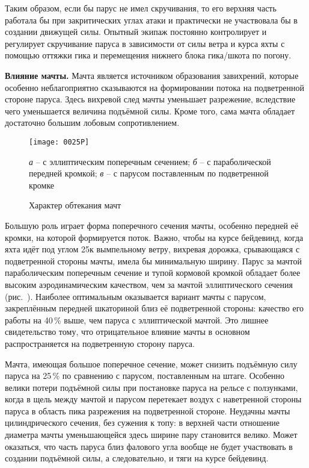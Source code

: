 Таким образом, если бы парус не имел скручивания, то его верхняя часть работала бы при закритических углах атаки и практически не участвовала бы в создании движущей силы. Опытный экипаж постоянно контролирует и регулирует скручивание паруса в зависимости от силы ветра и курса яхты с помощью оттяжки гика и перемещения нижнего блока гика\-/шкота по погону.

\textbf{Влияние мачты.} Мачта является источником образования завихрений, которые особенно неблагоприятно сказываются на формировании потока на подветренной стороне паруса. Здесь вихревой след мачты уменьшает разрежение, вследствие чего уменьшается величина подъёмной силы. Кроме того, сама мачта обладает достаточно большим лобовым сопротивлением. 

\begin{figure}[htb]
  \centering
  \texttt{[image: 0025P]}
  \caption{Характер обтекания мачт}
  \label{fig:25}
  \small
  \centering{}
  \textit{а} \--- с эллиптическим поперечным сечением; \textit{б} \--- с параболической передней кромкой; \textit{в} \--- с парусом поставленным по подветренной кромке
\end{figure}

Большую роль играет форма поперечного сечения мачты, особенно передней её кромки, на которой формируется поток. Важно, чтобы на курсе бейдевинд, когда яхта идёт под углом 25\gr к вымпельному ветру, вихревая дорожка, срывающаяся с подветренной стороны мачты, имела бы минимальную ширину. Парус за мачтой параболическим поперечным сечение и тупой кормовой кромкой обладает более высоким аэродинамическим качеством, чем за мачтой эллиптического сечения (рис.~). Наиболее оптимальным оказывается вариант мачты с парусом, закреплённым передней шкаториной близ её подветренной стороны: качество его работы на 40\,\% выше, чем паруса с эллиптической мачтой. Это лишнее свидетельство тому, что отрицательное влияние мачты в основном распространяется на подветренную сторону паруса.

Мачта, имеющая большое поперечное сечение, может снизить подъёмную силу паруса на 25\,\% по сравнению с парусом, поставленным на штаге. Особенно велики потери подъёмной силы при постановке паруса на рельсе с ползунками, когда в щель между мачтой и парусом перетекает воздух с наветренной стороны паруса в область пика разрежения на подветренной стороне. Неудачны мачты цилиндрического сечения, без сужения к топу: в верхней части отношение диаметра мачты уменьшающейся здесь ширине пару становится велико. Может оказаться, что часть паруса близ фалового угла вообще не будет участвовать в создании подъёмной силы, а следовательно, и тяги на курсе бейдевинд.

